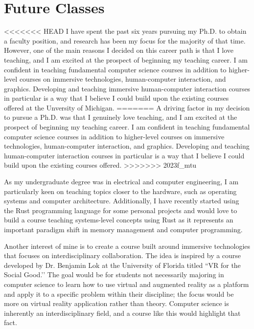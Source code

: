 \section*{Future Classes}
<<<<<<< HEAD
I have spent the past six years pursuing my Ph.D. to obtain a faculty position, and research has been my focus for the majority of that time. However, one of the main reasons I decided on this career path is that I love teaching, and I am excited at the prospect of beginning my teaching career. I am confident in teaching fundamental computer science courses in addition to higher-level courses on immersive technologies, human-computer interaction, and graphics. Developing and teaching immersive human-computer interaction courses in particular is a way that I believe I could build upon the existing courses offered at the Unversity of Michigan.
=======
\vspace{-0.5cm}
A driving factor in my decision to pursue a Ph.D. was that I genuinely love teaching, and I am excited at the prospect of beginning my teaching career. I am confident in teaching fundamental computer science courses in addition to higher-level courses on immersive technologies, human-computer interaction, and graphics. Developing and teaching human-computer interaction courses in particular is a way that I believe I could build upon the existing courses offered.
>>>>>>> 2023f_mtu

As my undergraduate degree was in electrical and computer engineering, I am particularly keen on teaching topics closer to the hardware, such as operating systems and computer architecture. Additionally, I have recently started using the Rust programming language for some personal projects and would love to build a course teaching systems-level concepts using Rust as it represents an important paradigm shift in memory management and computer programming.

Another interest of mine is to create a course built around immersive technologies that focuses on interdisciplinary collaboration. The idea is inspired by a course developed by Dr. Benjamin Lok at the University of Florida titled ``VR for the Social Good.’’ The goal would be for students not necessarily majoring in computer science to learn how to use virtual and augmented reality as a platform and apply it to a specific problem within their discipline; the focus would be more on virtual reality application rather than theory. Computer science is inherently an interdisciplinary field, and a course like this would highlight that fact.

\label{teaching_last}
